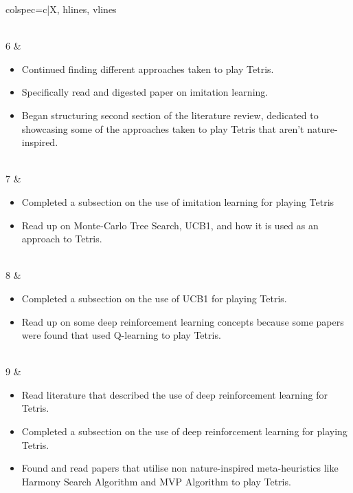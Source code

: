 \documentclass[a4paper, 12pt]{extreport}
\begin{document}
\begin{longtblr}[
		caption = Weekly breakdown of work done for Literature Review Chapter.
		]{colspec={c|X}, hlines, vlines}
\begin{varwidth}[t]{\linewidth}
\begin{itemize}[topsep=0pt,parsep=0pt]
			\end{itemize}
		\end{varwidth}\\
		6 & \begin{varwidth}[t]{\linewidth}
			\begin{itemize}[topsep=0pt,parsep=0pt]
				\item Continued finding different approaches taken to play Tetris.
				\item Specifically read and digested paper on imitation learning.
				\item Began structuring second section of the literature review, dedicated to showcasing some of the approaches taken to play Tetris that aren't nature-inspired.
			\end{itemize}
		\end{varwidth}\\
		7 & \begin{varwidth}[t]{\linewidth}
			\begin{itemize}[topsep=0pt,parsep=0pt]
				\item Completed a subsection on the use of imitation learning for playing Tetris
				\item Read up on Monte-Carlo Tree Search, UCB1, and how it is used as an approach to Tetris.
			\end{itemize}
		\end{varwidth}\\
		8 & \begin{varwidth}[t]{\linewidth}
			\begin{itemize}[topsep=0pt,parsep=0pt]
				\item Completed a subsection on the use of UCB1 for playing Tetris.
				\item Read up on some deep reinforcement learning concepts because some papers were found that used Q-learning to play Tetris.
			\end{itemize}
		\end{varwidth}\\
		9 & \begin{varwidth}[t]{\linewidth}
			\begin{itemize}[topsep=0pt,parsep=0pt]
				\item Read literature that described the use of deep reinforcement learning for Tetris.
				\item Completed a subsection on the use of deep reinforcement learning for playing Tetris.
				\item Found and read papers that utilise non nature-inspired meta-heuristics like Harmony Search Algorithm and MVP Algorithm to play Tetris.

\end{itemize}
\end{varwidth}
\end{longtblr}
\end{document}
